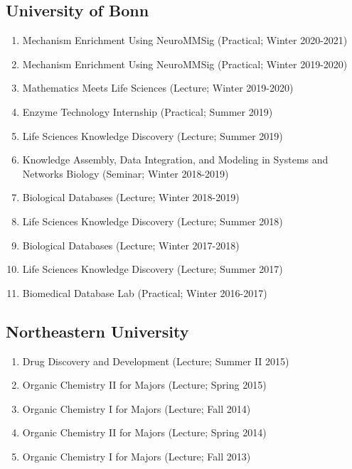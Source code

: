 \documentclass[10pt,a4paper,sans]{moderncv} %
\begin{document}
        \subsection{University of Bonn}
        \begin{enumerate}
        \item     Mechanism Enrichment Using NeuroMMSig (Practical; Winter 2020-2021)

        \item     Mechanism Enrichment Using NeuroMMSig (Practical; Winter 2019-2020)

        \item     Mathematics Meets Life Sciences (Lecture; Winter 2019-2020)

        \item     Enzyme Technology Internship (Practical; Summer 2019)

        \item     Life Sciences Knowledge Discovery (Lecture; Summer 2019)

        \item     Knowledge Assembly, Data Integration, and Modeling in Systems and Networks Biology (Seminar; Winter 2018-2019)

        \item     Biological Databases (Lecture; Winter 2018-2019)

        \item     Life Sciences Knowledge Discovery (Lecture; Summer 2018)

        \item     Biological Databases (Lecture; Winter 2017-2018)

        \item     Life Sciences Knowledge Discovery (Lecture; Summer 2017)

        \item     Biomedical Database Lab (Practical; Winter 2016-2017)

        \end{enumerate}
        \subsection{Northeastern University}
        \begin{enumerate}
        \item     Drug Discovery and Development (Lecture; Summer II 2015)

        \item     Organic Chemistry II for Majors (Lecture; Spring 2015)

        \item     Organic Chemistry I for Majors (Lecture; Fall 2014)

        \item     Organic Chemistry II for Majors (Lecture; Spring 2014)

        \item     Organic Chemistry I for Majors (Lecture; Fall 2013)

        \end{enumerate}
\end{document}
